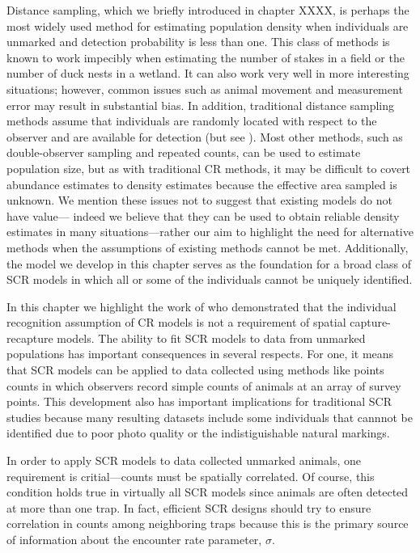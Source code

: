 Distance sampling, which we briefly introduced in chapter XXXX,
is perhaps the most widely used method for
estimating population density when individuals are unmarked and
detection probability is less than one. This class of methods is known
to work impecibly when estimating the number of stakes in a field or
the number of duck nests in a wetland. It can also work very well in
more interesting situations; however, %
common issues such as animal movement and measurement error may result in
substantial bias. In addition, traditional distance sampling methods
assume that individuals are randomly located with respect to the
observer and are available for detection (but see
\citet{johnson_etal:2010,chandler_etal:2011}). %
Most other
methods, such as double-observer sampling and repeated counts, can be
used to estimate population size, but as with traditional CR methods,
it may be difficult to covert abundance estimates to
density estimates because the effective area sampled is unknown. We
mention these issues not to suggest that existing models do not have
value---
indeed we believe that they can be used to obtain reliable density
estimates in many situations---rather our aim to highlight the need for
alternative methods when the assumptions of existing methods cannot be
met. Additionally, the model we develop in this chapter serves as the
foundation for a broad class of SCR models in which all or some of the
individuals cannot be uniquely identified.

In this chapter we highlight the work of \citet{chandler_royle:2012}
who demonstrated that the individual recognition assumption of
CR models is not a requirement of spatial capture-recapture
models. The ability to fit
SCR models to data from unmarked populations has important
consequences in several respects. For one, it means that SCR models can
be applied to data collected using methods like points counts in which
observers record simple counts of animals at an array of survey
points. This development also has important implications for
traditional SCR studies because many resulting datasets include some
individuals that cannnot be identified due to poor photo quality or
the indistiguishable natural markings.


In order to apply SCR models to data collected unmarked animals, one
requirement is critial---counts must be spatially correlated. Of
course, this condition holds true in virtually all SCR models since
animals are often detected at more than one trap. In fact, efficient
SCR designs should try to ensure correlation in counts among
neighboring traps because this is the primary source of information
about the encounter rate parameter, $\sigma$.

